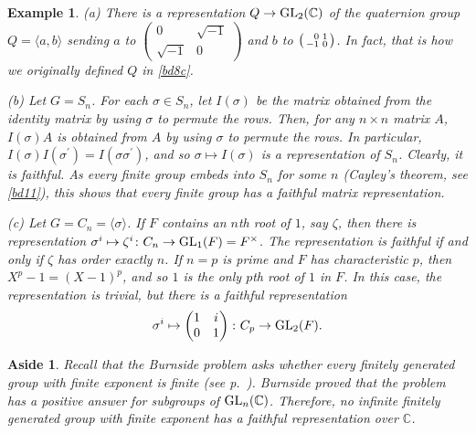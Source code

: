 \documentclass[a4paper,11pt,final]{memoir}%
\newtheorem{example}[X]{Example}
\newtheorem{aside}[X]{Aside}
\theoremstyle{nonumberplain}
\begin{document}
\begin{example}
\label{r1}(a) There is a representation $Q\rightarrow\operatorname{GL}_{2}(\mathbb{C})$ of
the quaternion group $Q=\langle a,b\rangle$ sending $a$ to $\left(
\begin{smallmatrix}
0 & \sqrt{-1}\\
\sqrt{-1} & 0
\end{smallmatrix}
\right)  $ and $b$ to $\left(
\begin{smallmatrix}
\hfill0 & 1\\
-1 & 0
\end{smallmatrix}
\right)  $. In fact, that is how we originally defined $Q$ in \ref{bd8c}.

(b) Let $G=S_{n}$. For each $\sigma\in S_{n}$, let $I(\sigma)$ be the matrix
obtained from the identity matrix by using $\sigma$ to permute the rows. Then,
for any $n\times n$ matrix $A$, $I(\sigma)A$ is obtained from $A$ by using
$\sigma$ to permute the rows. In particular, $I(\sigma)I(\sigma^{\prime
})=I(\sigma\sigma^{\prime})$, and so $\sigma\mapsto I(\sigma)$ is a
representation of $S_{n}$. Clearly, it is faithful. As every finite group
embeds into $S_{n}$ for some $n$ (Cayley's theorem, see \ref{bd11}), this
shows that every finite group has a faithful matrix representation.

(c) Let $G=C_{n}=\langle\sigma\rangle$. If $F$ contains an $n$th root of $1$,
say $\zeta$, then there is representation $\sigma^{i}\mapsto\zeta^{i}\colon
C_{n}\rightarrow\operatorname{GL}_{1}(F)=F^{\times}$. The representation is faithful if and
only if $\zeta$ has order exactly $n$. If $n=p$ is prime and $F$ has
characteristic $p$, then $X^{p}-1=(X-1)^{p}$, and so $1$ is the only $p$th
root of $1$ in $F$. In this case, the representation is trivial, but there is
a faithful representation%
\[
\sigma^{i}\mapsto%
\begin{pmatrix}
1 & i\\
0 & 1
\end{pmatrix}
\colon C_{p}\rightarrow\GL_{2}(F).
\]

\end{example}

\begin{aside}
\label{r1a}Recall that the Burnside problem asks whether every finitely
generated group with finite exponent is finite (see p.~\pageref{burnside}).
Burnside proved that the problem has a \textit{positive} answer for subgroups
of $\operatorname{GL}_{n}(\mathbb{C}{})$. Therefore, no infinite finitely generated group
with finite exponent has a faithful representation over $\mathbb{C}{}$.
\end{aside}
\end{document}
